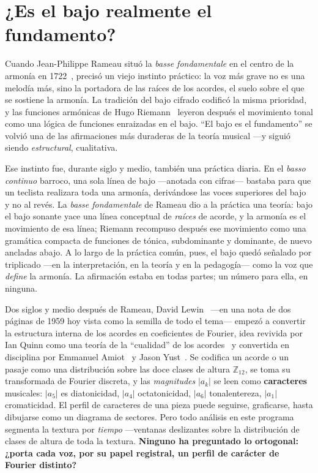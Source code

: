 \documentclass[11pt]{article}
\newcommand{\Ztwelve}{\mathbb{Z}_{12}}
\begin{document}
\section{¿Es el bajo realmente el fundamento?}\label{sec:hook}

Cuando Jean-Philippe Rameau situó la \emph{basse fondamentale} en el centro de la armonía en
1722~\cite{Rameau}, precisó un viejo instinto práctico: la voz más grave no es una melodía más, sino la
portadora de las raíces de los acordes, el suelo sobre el que se sostiene la armonía. La tradición del
bajo cifrado codificó la misma prioridad, y las funciones armónicas de Hugo Riemann~\cite{Riemann} leyeron
después el movimiento tonal como una lógica de funciones enraizadas en el bajo. ``El bajo es el fundamento''
se volvió una de las afirmaciones más duraderas de la teoría musical ---y siguió siendo \emph{estructural},
cualitativa.

Ese instinto fue, durante siglo y medio, también una práctica diaria. En el \emph{basso continuo} barroco,
una sola línea de bajo ---anotada con cifras--- bastaba para que un teclista realizara toda una armonía,
derivándose las voces superiores del bajo y no al revés. La \emph{basse fondamentale} de Rameau dio a la
práctica una teoría: bajo el bajo sonante yace una línea conceptual de \emph{raíces} de acorde, y la armonía
es el movimiento de esa línea; Riemann recompuso después ese movimiento como una gramática compacta de
funciones de tónica, subdominante y dominante, de nuevo ancladas abajo. A lo largo de la práctica común,
pues, el bajo quedó señalado por triplicado ---en la interpretación, en la teoría y en la pedagogía---
como la voz que \emph{define} la armonía. La afirmación estaba en todas partes; un número para ella, en
ninguna.

Dos siglos y medio después de Rameau, David Lewin~\cite{Lewin1959} ---en una nota de dos páginas de 1959 hoy
vista como la semilla de todo el tema--- empezó a convertir la estructura interna de los acordes en
coeficientes de Fourier, idea revivida por Ian Quinn como una teoría de la ``cualidad'' de los
acordes~\cite{Quinn} y convertida en disciplina por Emmanuel Amiot~\cite{Amiot} y Jason
Yust~\cite{Yust2017,Yust2019}. Se codifica un acorde o un pasaje como
una distribución sobre las doce clases de altura $\Ztwelve$, se toma su transformada de Fourier discreta, y
las \emph{magnitudes} $|a_k|$ se leen como \textbf{caracteres} musicales: $|a_5|$ es diatonicidad, $|a_4|$
octatonicidad, $|a_6|$ tonalentereza, $|a_1|$ cromaticidad. El perfil de caracteres de una pieza puede
seguirse, graficarse, hasta dibujarse como un diagrama de sectores. Pero todo análisis en este programa
segmenta la textura por \emph{tiempo} ---ventanas deslizantes sobre la distribución de clases de altura de
toda la textura. \textbf{Ninguno ha preguntado lo ortogonal: ¿porta cada voz, por su papel registral, un
perfil de carácter de Fourier distinto?}
\end{document}
